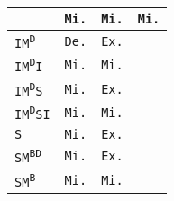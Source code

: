 \begin{tabular}{|l||c|c|c|}
 & \cellcolor{olive!80}\texttt{Mi.}
 & \cellcolor{olive!80}\texttt{Mi.}
 & \cellcolor{olive!80}\texttt{Mi.}
 \\
 \hline

 \texttt{IM\textsuperscript{D}}

 & \cellcolor{blue!40}\texttt{De.}
 & \cellcolor{orange!60}\texttt{Ex.}
 & \cellcolor{black!40}
 \\
 \hline

 \texttt{IM\textsuperscript{D}I}

 & \cellcolor{olive!80}\texttt{Mi.}
 & \cellcolor{olive!80}\texttt{Mi.}
 & \cellcolor{black!40}
 \\
 \hline

 \texttt{IM\textsuperscript{D}S}

 & \cellcolor{olive!80}\texttt{Mi.}
 & \cellcolor{orange!60}\texttt{Ex.}
 & \cellcolor{black!40}
 \\
 \hline

 \texttt{IM\textsuperscript{D}SI}

 & \cellcolor{olive!80}\texttt{Mi.}
 & \cellcolor{olive!80}\texttt{Mi.}
 & \cellcolor{black!40}
 \\
 \hline

 \texttt{S}


 & \cellcolor{olive!80}\texttt{Mi.}
 & \cellcolor{orange!60}\texttt{Ex.}
 & \cellcolor{black!40}
 \\
 \hline

 \texttt{SM\textsuperscript{BD}}


 & \cellcolor{olive!80}\texttt{Mi.}
 & \cellcolor{orange!60}\texttt{Ex.}
 & \cellcolor{black!40}
 \\
 \hline

 \texttt{SM\textsuperscript{B}}


 & \cellcolor{olive!80}\texttt{Mi.}
 & \cellcolor{olive!80}\texttt{Mi.}
 & \cellcolor{black!40}
 \\
 \hline


\end{tabular}
